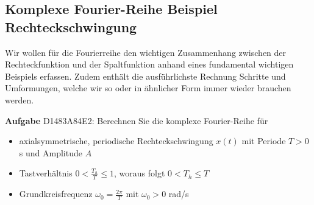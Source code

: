 \subsection{Komplexe Fourier-Reihe Beispiel Rechteckschwingung}
\label{sec:D1483A84E2}
%
\begin{Ziel}
Wir wollen für die Fourierreihe den wichtigen Zusammenhang zwischen der Rechteckfunktion
und der Spaltfunktion anhand eines fundamental wichtigen Beispiels erfassen. Zudem enthält die
ausführlichste Rechnung Schritte und Umformungen, welche wir so oder in ähnlicher Form
immer wieder brauchen werden.
\end{Ziel}
\textbf{Aufgabe} {\tiny D1483A84E2}: Berechnen Sie die komplexe Fourier-Reihe für
\begin{itemize}
\item axialsymmetrische, periodische Rechteckschwingung $x(t)$ mit Periode $T>0$ s
und Amplitude $A$
\item Tastverhältnis $0<\frac{T_h}{T}\leq 1$, woraus folgt $0 < T_h \leq T$
\item Grundkreisfrequenz $\omega_0 = \frac{2\pi}{T}$ mit $\omega_0>0$ rad/s
\end{itemize}
%
\begin{figure}[h!]
\centering
{}
\end{figure}
%
